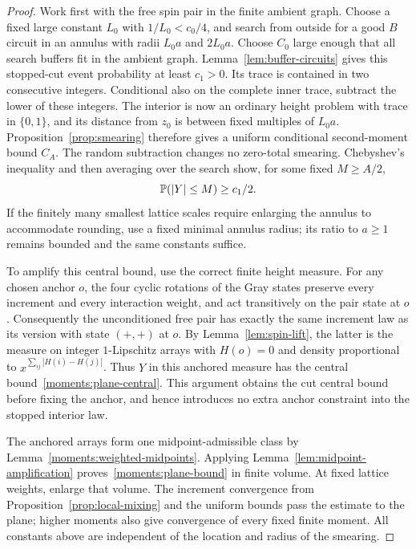 \begin{proof}
Work first with the free spin pair in the finite ambient graph.
Choose a fixed large constant $L_0$ with $1/L_0<c_0/4$, and search
from outside for a good $B$ circuit in an annulus with radii
$L_0a$ and $2L_0a$.  Choose $C_0$ large enough that all search buffers
fit in the ambient graph.  Lemma~\ref{lem:buffer-circuits} gives this
stopped-cut event probability at least $c_1>0$.  Its trace is contained
in two consecutive integers.  Conditional also on the complete inner
trace, subtract the lower of these integers.  The interior is now an
ordinary height problem with trace in $\{0,1\}$, and its distance from
$z_0$ is between fixed multiples of $L_0a$.  Proposition~\ref{prop:smearing}
therefore gives a uniform conditional second-moment bound $C_A$.
The random subtraction changes no zero-total smearing.  Chebyshev's
inequality and then averaging over the search show, for some fixed
$M\geq A/2$,
\begin{equation}\label{moments:plane-central}
 \mathbb P(|Y|\leq M)\geq c_1/2.
\end{equation}
If the finitely many smallest lattice scales require enlarging the
annulus to accommodate rounding, use a fixed minimal annulus radius;
its ratio to $a\geq1$ remains bounded and the same constants suffice.

To amplify this central bound, use the correct finite height measure.
For any chosen anchor $o$, the four cyclic rotations of the Gray states
preserve every increment and every interaction weight, and act
transitively on the pair state at $o$.  Consequently the unconditioned
free pair has exactly the same increment law as its version with state
$(+,+)$ at $o$.  By Lemma~\ref{lem:spin-lift}, the latter is the measure
on integer $1$-Lipschitz arrays with $H(o)=0$ and density proportional
to $x^{\sum_{ij}|H(i)-H(j)|}$.  Thus $Y$ in this anchored measure has
the central bound~\eqref{moments:plane-central}.  This argument obtains
the cut central bound before fixing the anchor, and hence introduces
no extra anchor constraint into the stopped interior law.

The anchored arrays form one midpoint-admissible class by
Lemma~\ref{moments:weighted-midpoints}.  Applying
Lemma~\ref{lem:midpoint-amplification} proves~\eqref{moments:plane-bound}
in finite volume.  At fixed lattice weights, enlarge that volume.
The increment convergence from Proposition~\ref{prop:local-mixing}
and the uniform bounds pass the estimate to the plane; higher moments
also give convergence of every fixed finite moment.  All constants
above are independent of the location and radius of the smearing.
\end{proof}

